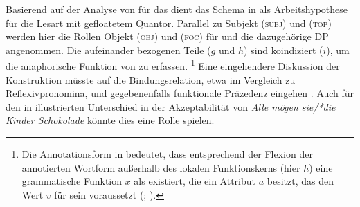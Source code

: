 Basierend auf der Analyse von \citet{spector2009} für das  dient das
Schema in  als Arbeits\-hypothese für die Lesart
mit gefloatetem Quantor. Parallel zu Subjekt (\textsc{subj}) und
 (\textsc{top}) werden hier die Rollen Objekt (\textsc{obj}) und
 (\textsc{foc}) für  und die dazugehörige
DP angenommen. Die aufeinander bezogenen Teile ($g$ und
$h$) sind koindiziert ($i$), um die anaphorische
Funktion von  zu erfassen.%
%
	\footnote{Die Annotationsform
		 in 
		bedeutet, dass entsprechend der Flexion der annotierten Wortform
		außerhalb des lokalen Funktionskerns (hier $h$) eine grammatische
		Funktion $x$ als  existiert, die ein Attribut $a$
		besitzt, das den Wert $v$ für sein  voraussetzt
		(;
		\cite[66--70]{bresnanetal2016}).}
%
Eine eingehendere Diskussion der Konstruktion müsste auf die
Bindungsrelation, etwa im Vergleich zu
Reflexivpronomina, und gegebenenfalls funktionale
Präzedenz eingehen \autocite[vgl.][213,
254--285]{bresnanetal2016}. Auch für den in  illustrierten
Unterschied in der Akzeptabilität von \textit{Alle mögen sie/*die Kinder
Schokolade} könnte dies eine Rolle spielen.

